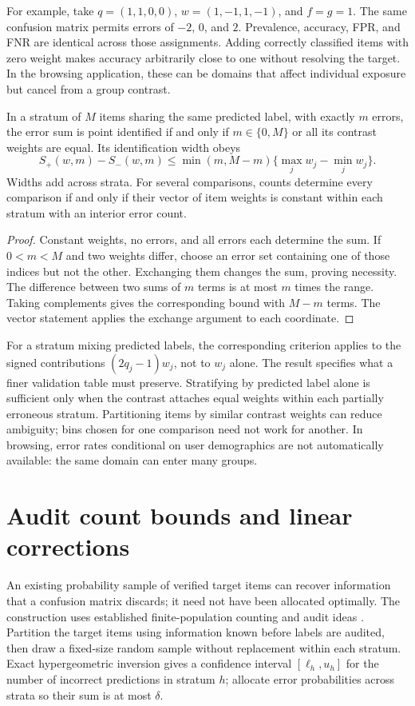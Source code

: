 For example, take $q=(1,1,0,0)$, $w=(1,-1,1,-1)$, and $f=g=1$.
The same confusion matrix permits errors of $-2$, $0$, and $2$.
Prevalence, accuracy, FPR, and FNR are identical across those assignments.
Adding correctly classified items with zero weight makes accuracy arbitrarily
close to one without resolving the target. In the browsing application, these
can be domains that affect individual exposure but cancel from a group contrast.

\begin{proposition}\label{prop:sufficient}
In a stratum of $M$ items sharing the same predicted label, with exactly
$m$ errors, the error sum is
point identified if and only if $m\in\{0,M\}$ or all its contrast weights are
equal. Its identification width obeys
\begin{equation}\label{eq:dispersion}
 S_+(w,m)-S_-(w,m)
 \leq \min(m,M-m)\{\max_jw_j-\min_jw_j\}.
\end{equation}
Widths add across strata. For several comparisons, counts determine every
comparison if and only if their vector of item weights is constant within
each stratum with an interior error count.
\end{proposition}
\begin{proof}
Constant weights, no errors, and all errors each determine the sum. If
$0<m<M$ and two weights differ, choose an error set containing one of those
indices but not the other. Exchanging them changes the sum, proving necessity.
The difference between two sums of $m$ terms is at most $m$ times the range.
Taking complements gives the corresponding bound with $M-m$ terms. The
vector statement applies the exchange argument to each coordinate.
\end{proof}
For a stratum mixing predicted labels, the corresponding criterion applies to
the signed contributions $(2q_j-1)w_j$, not to $w_j$ alone.
The result specifies what a finer validation table must preserve. Stratifying
by predicted label alone is sufficient only when the contrast attaches equal
weights within each partially erroneous stratum. Partitioning items by
similar contrast weights can reduce ambiguity; bins chosen for one comparison
need not work for another. In browsing, error rates conditional on user
demographics are not automatically available: the same domain can enter many
groups.

\section{Audit count bounds and linear corrections}\label{app:validation}
An existing probability sample of verified target items can recover information
that a confusion matrix discards; it need not have been allocated optimally.
The construction uses established finite-population counting and audit ideas
\citep{stark2008audits,shekhar2023audits}. Partition the target items using
information known before labels are audited, then draw a fixed-size random
sample without replacement within each stratum. Exact hypergeometric
inversion gives a confidence interval $[\ell_h,u_h]$ for the number of
incorrect predictions in stratum $h$; allocate error probabilities across
strata so their sum is at most $\delta$.

